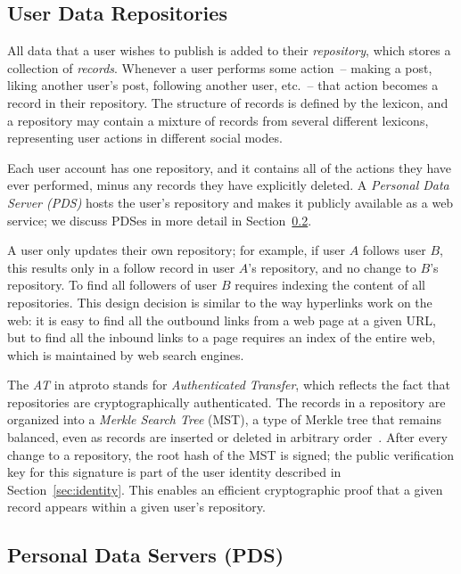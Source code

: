 \documentclass[sigconf,review]{acmart}
\begin{document}
\subsection{User Data Repositories}\label{sec:repos}

All data that a user wishes to publish is added to their \emph{repository}, which stores a collection of \emph{records}.
Whenever a user performs some action~-- making a post, liking another user's post, following another user, etc.~-- that action becomes a record in their repository.
The structure of records is defined by the lexicon, and a repository may contain a mixture of records from several different lexicons, representing user actions in different social modes.

Each user account has one repository, and it contains all of the actions they have ever performed, minus any records they have explicitly deleted.
A \emph{Personal Data Server (PDS)} hosts the user's repository and makes it publicly available as a web service; we discuss PDSes in more detail in Section~\ref{sec:pds}.

A user only updates their own repository; for example, if user $A$ follows user $B$, this results only in a follow record in user $A$'s repository, and no change to $B$'s repository.
To find all followers of user $B$ requires indexing the content of all repositories.
This design decision is similar to the way hyperlinks work on the web: it is easy to find all the outbound links from a web page at a given URL, but to find all the inbound links to a page requires an index of the entire web, which is maintained by web search engines.

The \emph{AT} in atproto stands for \emph{Authenticated Transfer}, which reflects the fact that repositories are cryptographically authenticated.
The records in a repository are organized into a \emph{Merkle Search Tree} (MST), a type of Merkle tree that remains balanced, even as records are inserted or deleted in arbitrary order~\cite{Auvolat:2019}.
After every change to a repository, the root hash of the MST is signed; the public verification key for this signature is part of the user identity described in Section~\ref{sec:identity}.
This enables an efficient cryptographic proof that a given record appears within a given user's repository.

\subsection{Personal Data Servers (PDS)}\label{sec:pds}
\end{document}
